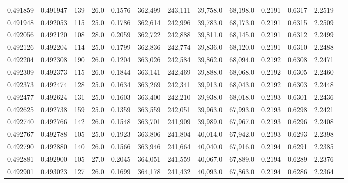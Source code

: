 \begin{tabular}{rrrrrrrrrrrrr}
0.491859 & 0.491947 &   139 & 26.0 &                                     0.1576 & 362,499 & 243,111 &  39,758.0 &  68,198.0 & 0.2191 & 0.6317 & 2.2519 \\
0.491948 & 0.492053 &   115 & 25.0 &                                     0.1786 & 362,614 & 242,996 &  39,783.0 &  68,173.0 & 0.2191 & 0.6315 & 2.2509 \\
0.492056 & 0.492120 &   108 & 28.0 &                                     0.2059 & 362,722 & 242,888 &  39,811.0 &  68,145.0 & 0.2191 & 0.6312 & 2.2499 \\
0.492126 & 0.492204 &   114 & 25.0 &                                     0.1799 & 362,836 & 242,774 &  39,836.0 &  68,120.0 & 0.2191 & 0.6310 & 2.2488 \\
0.492204 & 0.492308 &   190 & 26.0 &                                     0.1204 & 363,026 & 242,584 &  39,862.0 &  68,094.0 & 0.2192 & 0.6308 & 2.2471 \\
0.492309 & 0.492373 &   115 & 26.0 &                                     0.1844 & 363,141 & 242,469 &  39,888.0 &  68,068.0 & 0.2192 & 0.6305 & 2.2460 \\
0.492373 & 0.492474 &   128 & 25.0 &                                     0.1634 & 363,269 & 242,341 &  39,913.0 &  68,043.0 & 0.2192 & 0.6303 & 2.2448 \\
0.492477 & 0.492624 &   131 & 25.0 &                                     0.1603 & 363,400 & 242,210 &  39,938.0 &  68,018.0 & 0.2193 & 0.6301 & 2.2436 \\
0.492625 & 0.492738 &   159 & 25.0 &                                     0.1359 & 363,559 & 242,051 &  39,963.0 &  67,993.0 & 0.2193 & 0.6298 & 2.2421 \\
0.492740 & 0.492766 &   142 & 26.0 &                                     0.1548 & 363,701 & 241,909 &  39,989.0 &  67,967.0 & 0.2193 & 0.6296 & 2.2408 \\
0.492767 & 0.492788 &   105 & 25.0 &                                     0.1923 & 363,806 & 241,804 &  40,014.0 &  67,942.0 & 0.2193 & 0.6293 & 2.2398 \\
0.492790 & 0.492880 &   140 & 26.0 &                                     0.1566 & 363,946 & 241,664 &  40,040.0 &  67,916.0 & 0.2194 & 0.6291 & 2.2385 \\
0.492881 & 0.492900 &   105 & 27.0 &                                     0.2045 & 364,051 & 241,559 &  40,067.0 &  67,889.0 & 0.2194 & 0.6289 & 2.2376 \\
0.492901 & 0.493023 &   127 & 26.0 &                                     0.1699 & 364,178 & 241,432 &  40,093.0 &  67,863.0 & 0.2194 & 0.6286 & 2.2364 \\

\end{tabular}
